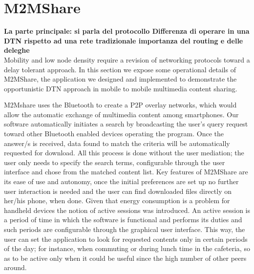 
\chapter{M2MShare}\label{m2mshare} %





\textbf{La parte principale: si parla del protocollo
Differenza di operare in una DTN rispetto ad una rete tradizionale
importanza del routing e delle deleghe}
\\
Mobility and low node density require a revision of networking protocols toward a delay tolerant approach. In this section we expose some operational details of M2MShare, the application we designed and implemented to demonstrate the opportunistic DTN approach in mobile to mobile multimedia content sharing.

M2Mshare uses the Bluetooth to create a P2P overlay networks, which would allow the automatic exchange of multimedia content among smartphones. Our software automatically initiates a search by broadcasting the user’s query request toward other Bluetooth enabled devices operating the program. Once the answer/s is received, data found to match the criteria will be automatically requested for download. All this process is done without the user mediation; the user only needs to specify the search terms, configurable through the user interface and chose from the matched content list. Key features of M2MShare are its ease of use and autonomy, once the initial preferences are set up no further user interaction is needed and the user can find downloaded files directly on her/his phone, when done.
Given that energy consumption is a problem for handheld devices the notion of active sessions was introduced. An active session is a period of time in which the software is functional and performs its duties and such periods are configurable through the graphical user interface. This way, the user can set the application to look for requested contents only in certain periods of the day; for instance, when commuting or during lunch time in the cafeteria, so as to be active only when it could be useful since the high number of other peers around.

